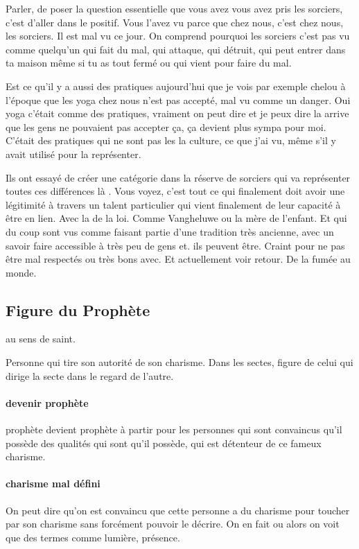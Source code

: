 Parler, de poser la question essentielle que vous avez vous avez pris les sorciers, c'est d'aller dans le positif. Vous l'avez vu parce que chez nous, c'est chez nous, les sorciers. Il est mal vu ce jour. On comprend pourquoi les sorciers c'est pas vu comme quelqu'un qui fait du mal, qui attaque, qui détruit, qui peut entrer dans ta maison même si tu as tout fermé ou qui vient pour faire du mal.

Est ce qu'il y a aussi des pratiques aujourd'hui que je vois par exemple chelou à  l'époque que les yoga chez nous n'est pas accepté, mal vu comme un danger. Oui yoga c'était comme des pratiques, vraiment on peut dire et je peux dire la arrive que les gens ne pouvaient pas accepter ça, ça devient plus sympa pour moi. C'était  des pratiques qui ne sont pas les la culture, ce que j'ai vu, même s'il y avait utilisé pour la représenter.
 
Ils ont essayé de créer une catégorie dans la réserve de sorciers qui va représenter toutes ces différences là . Vous voyez, c'est tout ce qui finalement doit avoir une légitimité à  travers un talent particulier qui vient finalement de leur capacité à  être en lien.
Avec la de la loi. Comme Vangheluwe ou la mère de l'enfant.
Et qui du coup sont vus comme faisant partie d'une tradition très ancienne, avec un savoir faire accessible à  très peu de gens et.  ils peuvent être.
Craint pour ne pas être mal respectés ou très bons avec.
Et actuellement voir retour.
De la fumée au monde.

\subsection{Figure du Prophète}
au sens de saint.
\begin{Def}[prophète]
    Personne qui tire son autorité de son charisme. Dans les sectes, figure de celui qui dirige la secte dans le regard de l'autre. 
\end{Def}
\paragraph{devenir prophète} prophète devient prophète à  partir pour les personnes qui sont convaincus qu'il possède des qualités qui sont qu'il possède, qui est détenteur de ce fameux charisme. 

\paragraph{charisme mal défini}
On peut dire qu'on est convaincu que cette personne a du charisme pour toucher par son charisme sans forcément pouvoir le décrire. On en fait ou alors on voit que des termes comme lumière, présence.  
